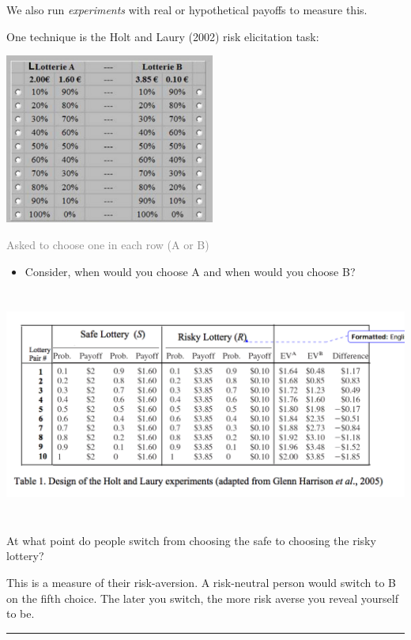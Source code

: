 \documentclass[]{article}
\providecommand{\tightlist}{%
  \setlength{\itemsep}{0pt}\setlength{\parskip}{0pt}}
\begin{document}
We also run \emph{experiments} with real or hypothetical payoffs to measure this.

One technique is the Holt and Laury (2002) risk elicitation task:

\includegraphics[height=2.2in]{picsfigs/holtlaurie.png}

\textcolor{gray}{Asked to choose one in each row (A or B)}

\begin{itemize}
\tightlist
\item
  Consider, when would you choose A and when would you choose B?
\end{itemize}

\bigskip

\includegraphics[height=3in]{picsfigs/holtlauriedetail.png}

At what point do people switch from choosing the safe to choosing the risky lottery?

This is a measure of their risk-aversion. A risk-neutral person would switch to B on the fifth choice.
The later you switch, the more risk averse you reveal yourself to be.

\begin{center}\rule{0.5\linewidth}{\linethickness}\end{center}
\end{document}
